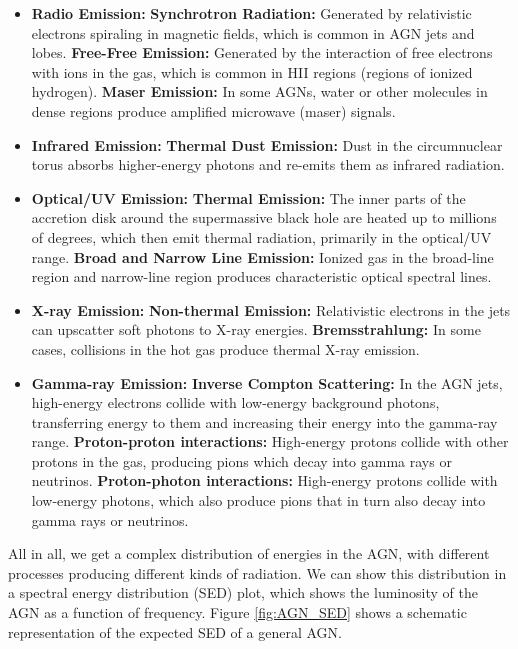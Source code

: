 \begin{itemize}
    \item \textbf{Radio Emission:}
    \subitem \textbf{Synchrotron Radiation:} Generated by relativistic electrons spiraling in magnetic fields, which is common in AGN jets and lobes.
    \subitem \textbf{Free-Free Emission:} Generated by the interaction of free electrons with ions in the gas, which is common in HII regions (regions of ionized hydrogen).
    \subitem \textbf{Maser Emission:} In some AGNs, water or other molecules in dense regions produce amplified microwave (maser) signals.
    \item \textbf{Infrared Emission:}
    \subitem \textbf{Thermal Dust Emission:} Dust in the circumnuclear torus absorbs higher-energy photons and re-emits them as infrared radiation.
    \item \textbf{Optical/UV Emission:}
    \subitem \textbf{Thermal Emission:} The inner parts of the accretion disk around the supermassive black hole are heated up to millions of degrees, which then emit thermal radiation, primarily in the optical/UV range.
    \subitem \textbf{Broad and Narrow Line Emission:} Ionized gas in the broad-line region and narrow-line region produces characteristic optical spectral lines.
    \item \textbf{X-ray Emission:}
    \subitem \textbf{Non-thermal Emission:} Relativistic electrons in the jets can upscatter soft photons to X-ray energies.
    \subitem \textbf{Bremsstrahlung:} In some cases, collisions in the hot gas produce thermal X-ray emission.
    \item \textbf{Gamma-ray Emission:} 
    \subitem \textbf{Inverse Compton Scattering:} In the AGN jets, high-energy electrons collide with low-energy background photons, transferring energy to them and increasing their energy into the gamma-ray range.
    \subitem \textbf{Proton-proton interactions:} High-energy protons collide with other protons in the gas, producing pions which decay into gamma rays or neutrinos.
    \subitem \textbf{Proton-photon interactions:} High-energy protons collide with low-energy photons, which also produce pions that in turn also decay into gamma rays or neutrinos.

\end{itemize}

All in all, we get a complex distribution of energies in the AGN, with different processes producing different kinds of radiation. We can show this distribution in a spectral energy distribution (SED) plot, which shows the luminosity of the AGN as a function of frequency. Figure \ref{fig:AGN_SED} shows a schematic representation of the expected SED of a general AGN.

